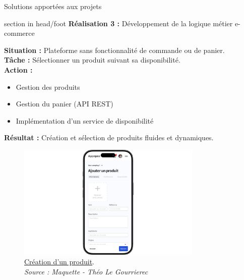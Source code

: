 \documentclass{beamer}
\begin{document}
\begin{frame}{Solutions apportées aux projets}
	\begin{beamercolorbox}[wd=\paperwidth,ht=1.5em,dp=0.5em,leftskip=0.5cm]{section in head/foot}
  		\large \textbf{Réalisation 3 :} \normalsize Développement de la logique métier e-commerce
	\end{beamercolorbox}
	\vspace{0.5em}
	\begin{center}
		 {
  			\begin{minipage}{0.9\textwidth}
  				\textbf{Situation :} Plateforme sans fonctionnalité de commande ou de panier. \pause \\
  				\textbf{Tâche :} Sélectionner un produit suivant sa disponibilité. \pause \\
  				\textbf{Action :}
				\begin{itemize}
					\item Gestion des produits
					\item Gestion du panier (API REST)
					\item Implémentation d'un service de disponibilité
				\end{itemize}
				\pause

				\textbf{Résultat :} Création et sélection de produits fluides et dynamiques.
  			\end{minipage}
  		}
  		
  		\only<5> {
			\begin{figure}[t]
  				\includegraphics[height=5.5cm]{../img/maquette/crud_produit.png}
				\caption{	
					\centering			
  					\href{https://github.com/Matteo-K/Soutenance_E-delic/blob/main/img/maquette/crud_produit.png}{\underline{Création d'un produit}}.\\
  					\textit{Source : Maquette - Théo Le Gourrierec}
				}
  				\label{fig:crud_produit}
  			\end{figure}
		}
		

\end{center}
\end{frame}
\end{document}
